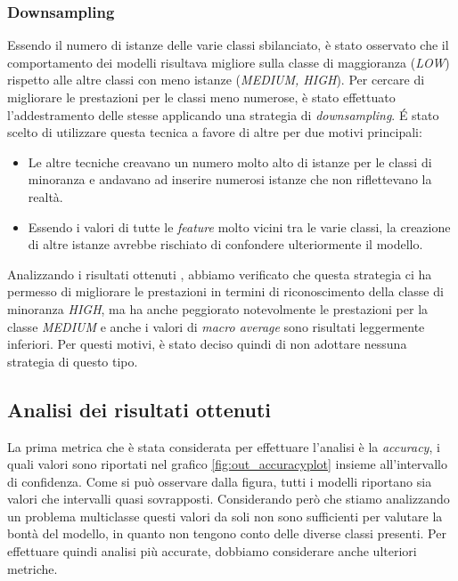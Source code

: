         
        \subsubsection{Downsampling}
            Essendo il numero di istanze delle varie classi sbilanciato, è stato osservato che il comportamento dei modelli risultava migliore sulla classe di maggioranza (\textit{LOW}) rispetto alle altre classi con meno istanze (\textit{MEDIUM, HIGH}). Per cercare di migliorare le prestazioni per le classi meno numerose, è stato effettuato l'addestramento delle stesse applicando una strategia di \textit{downsampling}. \'E stato scelto di utilizzare questa tecnica a favore di altre per due motivi principali: 
            \begin{itemize}
                \item Le altre tecniche creavano un numero molto alto di istanze per le classi di minoranza e andavano ad inserire numerosi istanze che non riflettevano la realtà.
                \item Essendo i valori di tutte le \textit{feature} molto vicini tra le varie classi, la creazione di altre istanze avrebbe rischiato di confondere ulteriormente il modello.
            \end{itemize}
            Analizzando i risultati ottenuti , abbiamo verificato che questa strategia ci ha permesso di migliorare le prestazioni in termini di riconoscimento della classe di minoranza \textit{HIGH}, ma ha anche peggiorato notevolmente le prestazioni per la classe \textit{MEDIUM} e anche i valori di \textit{macro average} sono risultati leggermente inferiori. Per questi motivi, è stato deciso quindi di non adottare nessuna strategia di questo tipo.

    \subsection{Analisi dei risultati ottenuti}
    La prima metrica che è stata considerata per effettuare l'analisi è la \textit{accuracy}, i quali valori sono riportati nel grafico \ref{fig:out_accuracyplot} insieme all'intervallo di confidenza. Come si può osservare dalla figura, tutti i modelli riportano sia valori che intervalli quasi sovrapposti. Considerando però che stiamo analizzando un problema multiclasse questi valori da soli non sono sufficienti per valutare la bontà del modello, in quanto non tengono conto delle diverse classi presenti. Per effettuare quindi analisi più accurate, dobbiamo considerare anche ulteriori metriche.
    
